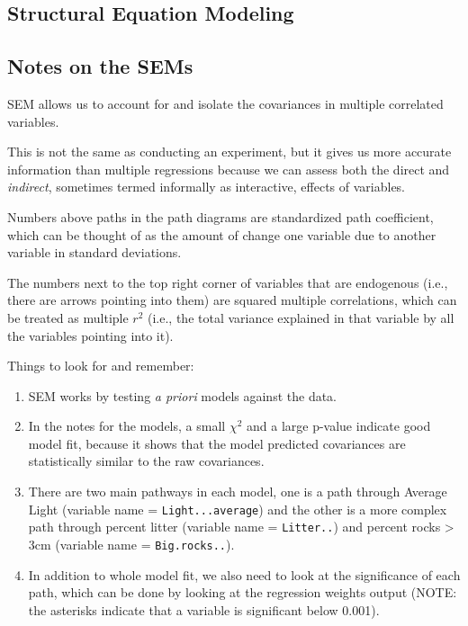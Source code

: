 \documentclass[a4paper]{article}
\begin{document}
\subsection{Structural Equation Modeling}

\subsection{Notes on the SEMs}

\begin{description}
\item[ ] SEM allows us to account for and isolate the covariances in multiple correlated variables. 
\item This is not the same as conducting an experiment, but it gives us more accurate information than multiple regressions because we can assess both the direct and \textit{indirect}, sometimes termed informally as interactive, effects of variables.
\item Numbers above paths in the path diagrams are standardized path coefficient, which can be thought of as the amount of change one variable due to another variable in standard deviations. 
\item The numbers next to the top right corner of variables that are endogenous (i.e., there are arrows pointing into them) are squared multiple correlations, which can be treated as multiple $r^2$ (i.e., the total variance explained in that variable by all the variables pointing into it).
\item Things to look for and remember:
\begin{enumerate}
\item SEM works by testing \textit{a priori} models against the data.
\item In the notes for the models, a small $\chi^2$ and a large p-value indicate good model fit, because it shows that the model predicted covariances are statistically similar to the raw covariances.
\item There are two main pathways in each model, one is a path through Average Light (variable name = \texttt{Light...average}) and the other is a more complex path through percent litter (variable name = \texttt{Litter..}) and percent rocks > 3cm (variable name = \texttt{Big.rocks..}).
\item In addition to whole model fit, we also need to look at the significance of each path, which can be done by looking at the regression weights output (NOTE: the asterisks indicate that a variable is significant below 0.001).
\end{enumerate}


\end{description}
\end{document}
